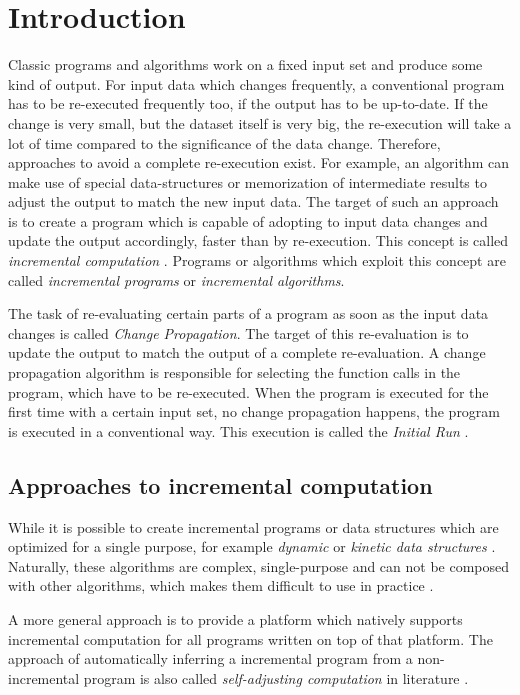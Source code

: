 \section{Introduction}
Classic programs and algorithms work on a fixed input set and produce some kind of output. For input data which changes frequently, a conventional program has to be re-executed frequently too, if the output has to be up-to-date. If the change is very small, but the dataset itself is very big, the re-execution will take a lot of time compared to the significance of the data change. Therefore, approaches to avoid a complete re-execution exist. For example, an algorithm can make use of special data-structures or memorization of intermediate results to adjust the output to match the new input data. The target of such an approach is to create a program which is capable of adopting to input data changes and update the output accordingly, faster than by re-execution. This concept is called \textit{incremental computation} \cite{Ramalingam:IncrementalBibliography}. Programs or algorithms which exploit this concept are called \textit{incremental programs} or \textit{incremental algorithms}. 

The task of re-evaluating certain parts of a program as soon as the input data changes is called \textit{Change Propagation}. The target of this re-evaluation is to update the output to match the output of a complete re-evaluation. A change propagation algorithm is responsible for selecting the function calls in the program, which have to be re-executed. When the program is executed for the first time with a certain input set, no change propagation happens, the program is executed in a conventional way. This execution is called the \textit{Initial Run} \cite{Acar2005thesis}.

\subsection{Approaches to incremental computation}
While it is possible to create incremental programs or data structures which are optimized for a single purpose, for example \textit{dynamic} or \textit{kinetic data structures} \cite{Guibas98kineticdata}. Naturally, these algorithms are complex, single-purpose and can not be composed with other algorithms, which makes them difficult to use in practice \cite{Acar2005thesis}. 
 
A more general approach is to provide a platform which natively supports incremental computation for all programs written on top of that platform. The approach of automatically inferring a incremental program from a non-incremental program is also called \textit{self-adjusting computation} in literature \cite{Harper2004} \cite{Acar2005thesis}. 

